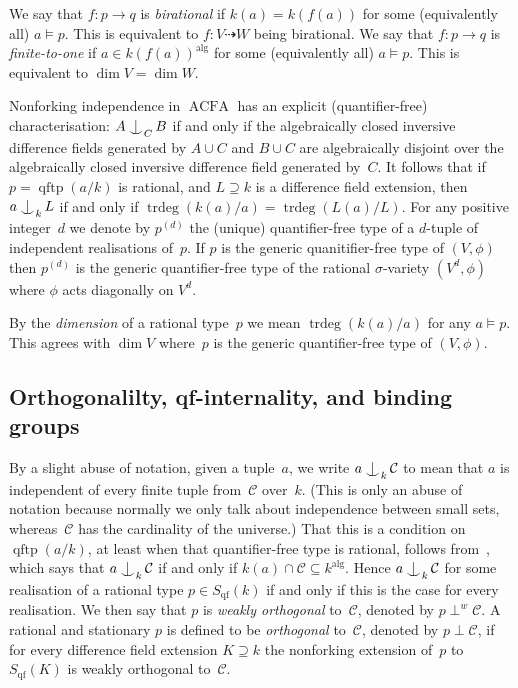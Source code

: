 \documentclass[\DocOpts]{amsart}
\theoremstyle{definition}
\def\acfa{\operatorname{ACFA}}
\def\qftp{\operatorname{qftp}}
\def\qf{\operatorname{qf}}
\def\alg{{\operatorname{alg}}}
\def\trdeg{\operatorname{trdeg}}
\def\C{\mathcal{C}}
\newcommand{\<}{\langle}
\renewcommand{\>}{\rangle}
\newcommand{\dto}{\dashrightarrow}
\def\Ind#1#2{#1\setbox0=\hbox{\(#1x\)}\kern\wd0\hbox to 
0pt{\hss\(#1\mid\)\hss}\lower.9\ht0\hbox to 
0pt{\hss\(#1\smile\)\hss}\kern\wd0}
\def\ind{\mathop{\mathpalette\Ind{}}}
\begin{document}
We say that $f:p\to q$ is \emph{birational} if $k(a)=k(f(a))$ for some (equivalently all) $a\models p$.
This is equivalent to $f:V\dto W$ being birational.
We say that $f:p\to q$ is \emph{finite-to-one} if $a\in {k(f(a))}^{\alg}$ for 
some (equivalently all) $a\models p$.
This is equivalent to $\dim V=\dim W$.

Nonforking independence in $\acfa$ has an explicit (quantifier-free) characterisation: $A\ind_CB$ if and only if the algebraically closed inversive difference fields generated by $A\cup C$ and $B\cup C$ are algebraically disjoint over the algebraically closed inversive difference field generated by~$C$.
It follows that if $p=\qftp(a/k)$ is rational, and $L\supseteq k$ is a difference field extension, then $a\ind_kL$ if and only if $\trdeg(k(a)/a)=\trdeg(L(a)/L)$.
For any positive integer~$d$ we denote by $p^{(d)}$ the (unique) quantifier-free type of a $d$-tuple of independent realisations of~$p$.
If $p$ is the generic quanitifier-free type of $(V,\phi)$ then $p^{(d)}$ is the generic quantifier-free type of the rational $\sigma$-variety $(V^d,\phi)$ where $\phi$ acts diagonally on $V^d$.

By the {\em dimension} of a rational type~$p$ we mean $\trdeg(k(a)/a)$ for any $a\models p$.
This agrees with $\dim V$ where~$p$ is the generic quantifier-free type of $(V,\phi)$.

\medskip
\subsection{Orthogonalilty, qf-internality, and binding groups}
\label{subsect:nonorth}
By a slight abuse of notation, given a tuple~$a$, we write $a\ind_k\C$ to mean that $a$ is independent of every finite tuple from~$\C$ over~$k$.
(This is only an abuse of notation because normally we only talk about independence between small sets, whereas~$\C$ has the cardinality of the universe.)
That this is a condition on $\qftp(a/k)$, at least when that quantifier-free type is rational, follows from~\cite[Proposition~2.7]{qfint}, which says that $a\ind_k\C$ if and only if $k(a)\cap\C\subseteq k^{\alg}$.
Hence $a\ind_k\C$ for some realisation of a rational type $p\in S_{\qf}(k)$ if and only if this is the case for every realisation.
We then say that $p$ is  \emph{weakly orthogonal} to~$\C$, denoted by $p\perp^w\C$.
A rational and stationary $p$ is defined to be \emph{orthogonal} to~$\C$, denoted by $p\perp\C$, if for every difference field extension $K\supseteq k$ the nonforking extension of~$p$ to $S_{\qf}(K)$ is weakly orthogonal to~$\C$.
\end{document}
